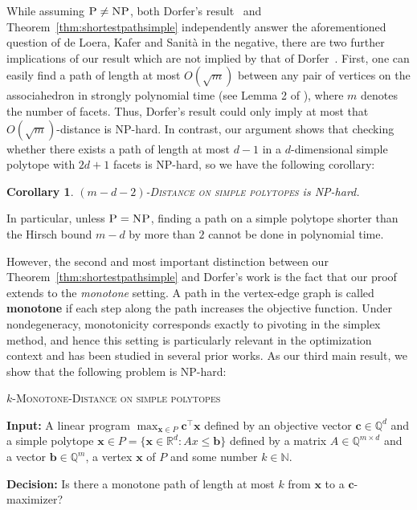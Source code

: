 \documentclass[centering,11pt,reqno]{amsart}
\newtheorem{cor}[theorem]{Corollary}
\theoremstyle{definition}
\newcommand{\NP}{\textsc{NP}}
\newcommand{\PP}{\textsc{P}}
\begin{document}
While assuming $\PP\neq \NP$, both Dorfer's result~\cite{associahedronhard} and Theorem~\ref{thm:shortestpathsimple} independently answer the aforementioned question of de Loera, Kafer and Sanit\`{a} in the negative, there are two further implications of our result which are not implied by that of Dorfer~\cite{associahedronhard}. First, one can easily find a path of length at most $O(\sqrt{m})$ between any pair of vertices on the associahedron in strongly polynomial time (see Lemma 2 of \cite{sleatortarjanthurston}), where $m$ denotes the number of facets. Thus, Dorfer's result could only imply at most that $O(\sqrt{m})$-distance is \NP-hard. In contrast, our argument shows that checking whether there exists a path of length at most $d-1$ in a $d$-dimensional simple polytope with $2d+1$ facets is NP-hard, so we have the following corollary:

\begin{cor}\label{mdcor}
$(m-d-2)$-\textsc{Distance on simple polytopes} is \NP-hard.
\end{cor}

In particular, unless $\PP = \NP$, finding a path on a simple polytope shorter than the Hirsch bound $m-d$ by more than $2$ cannot be done in polynomial time. 

However, the second and most important distinction between our Theorem~\ref{thm:shortestpathsimple} and Dorfer's work is the fact that our proof extends to the \emph{monotone} setting. A path in the vertex-edge graph is called \textbf{monotone} if each step along the path increases the objective function. Under nondegeneracy, monotonicity corresponds exactly to pivoting in the simplex method, and hence this setting is particularly relevant in the optimization context and has been studied in several prior works. As our third main result, we show that the following problem is NP-hard:

\medskip

\begin{mdframed}[innerleftmargin=0.5em, innertopmargin=0.5em, innerrightmargin=0.5em, innerbottommargin=0.5em, userdefinedwidth=0.95\linewidth, align=center]
	{$k$-\textsc{Monotone-Distance on simple polytopes}}
	\sloppy

	\noindent
	\textbf{Input:} A linear program $\max_{\mathbf{x}\in P}\mathbf{c}^{\intercal}\mathbf{x}$ defined by an objective vector $\mathbf{c} \in \mathbb{Q}^{d}$ and a simple polytope $\mathbf{x} \in P = \{\mathbf{x}\in \mathbb{R}^d\colon Ax\leq \mathbf{b}\}$ defined by a matrix $A\in \mathbb{Q}^{m\times d}$ and a vector $\mathbf{b} \in \mathbb{Q}^m$, a vertex $\mathbf{x}$ of $P$ and some number $k\in\mathbb{N}$.

	\noindent
	\textbf{Decision:} Is there a monotone path of length at most $k$ from $\mathbf{x}$ to a $\mathbf{c}$-maximizer?
\end{mdframed}
\end{document}
